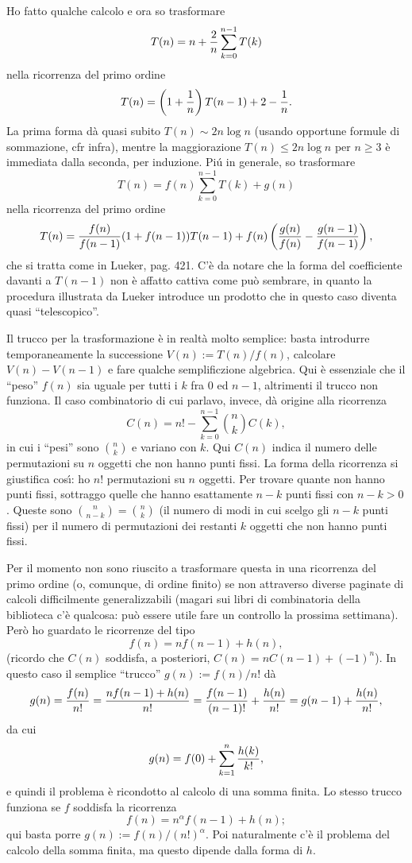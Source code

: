 \documentclass{article}[12]
\begin{document}
Ho fatto qualche calcolo e ora so trasformare 
$$
T(n) = n + {2\over n} \sum_{k=0}^{n-1} T(k)
$$
nella ricorrenza del primo ordine 
$$
T(n) = \left( 1 + {1\over n} \right) T(n-1) + 2 - {1\over n}.
$$
La prima forma d\`a quasi subito $T(n)\sim 2n\log n$ (usando opportune
formule di 
sommazione, cfr infra), mentre la maggiorazione $T(n)\le 2n\log n$ per
$n\ge3$ \`e immediata dalla 
seconda, per induzione. 
Pi\'u in generale, so trasformare 
$$
T(n) = f(n) \sum_{k=0}^{n-1} T(k) + g(n)
$$
nella ricorrenza del primo ordine 
$$
T(n) = {f(n)\over f(n-1)} (1+f(n-1)) T(n-1)
+ f(n) \left( {g(n)\over f(n)} - {g(n-1)\over f(n-1)} \right),
$$
che si tratta come in Lueker, pag. 421. C'\`e da notare che la forma
del coefficiente davanti a 
$T(n-1)$ non \`e affatto cattiva come pu\`o sembrare, in quanto la
procedura illustrata da 
Lueker introduce un prodotto che in questo caso diventa quasi
``telescopico''. 

Il trucco per la trasformazione \`e in realt\`a molto semplice: basta
introdurre temporaneamente 
la successione $V(n):=T(n)/f(n)$, calcolare $V(n)-V(n-1)$ e fare
qualche semplificzione algebrica. 
Qui \`e essenziale che il ``peso'' $f(n)$ sia uguale per tutti i $k$
fra 0 ed $n-1$, altrimenti 
il trucco non funziona. Il caso combinatorio di cui parlavo, invece,
d\`a origine alla ricorrenza 
$$
C(n) = n! - \sum_{k=0}^{n-1} {n\choose k} C(k),
$$
in cui i ``pesi'' sono $n\choose k$ e variano con $k$. Qui $C(n)$
indica il numero delle 
permutazioni su $n$ oggetti che non hanno punti fissi. La forma della
ricorrenza si giustifica 
cos\'\i: ho $n!$ permutazioni su $n$ oggetti. Per trovare quante non
hanno punti fissi, sottraggo 
quelle che hanno esattamente $n-k$ punti fissi con $n-k>0$. Queste
sono 
${n\choose n-k}={n\choose k}$ (il numero di modi in cui scelgo gli
$n-k$ punti fissi) per il 
numero di permutazioni dei restanti $k$ oggetti che non hanno punti
fissi. 

Per il momento non sono riuscito a trasformare questa in una
ricorrenza del primo ordine 
(o, comunque, di ordine finito) se non attraverso diverse paginate di
calcoli difficilmente 
generalizzabili (magari sui libri di combinatoria della biblioteca
c'\`e qualcosa: pu\`o essere 
utile fare un controllo la prossima settimana). Per\`o ho guardato le
ricorrenze del tipo 
$$
f(n) = n f(n-1) + h(n),
$$
(ricordo che $C(n)$ soddisfa, a posteriori, $C(n) = nC(n-1) +
(-1)^n$). In questo caso il semplice 
``trucco'' $g(n):=f(n)/n!$ d\`a 
$$
g(n) = {f(n)\over n!} = {n f(n-1) + h(n)\over n!}
= {f(n-1)\over(n-1)!} + {h(n)\over n!} = g(n-1) + {h(n)\over n!},
$$
da cui 
$$
g(n) = f(0) + \sum_{k=1}^n {h(k)\over k!},
$$
e quindi il problema \`e ricondotto al calcolo di una somma finita. 
Lo stesso trucco funziona se $f$ soddisfa la ricorrenza 
$$
f(n) = n^\alpha f(n-1) + h(n);
$$
qui basta porre $g(n):=f(n)/(n!)^\alpha$. Poi naturalmente c'\`e il
problema del calcolo 
della somma finita, ma questo dipende dalla forma di $h$. 
\end{document}
